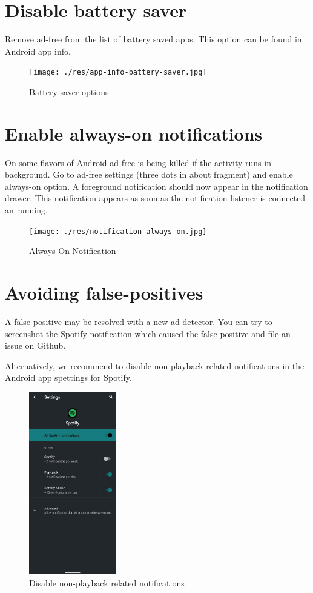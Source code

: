 \documentclass[11pt]{article}
\begin{document}
\section{Disable battery saver}
\label{sec:org518a8ee}
Remove ad-free from the list of battery saved apps. This option can be
found in Android app info.

\begin{figure}[htbp]
\centering
\texttt{[image: ./res/app-info-battery-saver.jpg]}
\caption{Battery saver options}
\end{figure}

\section{Enable always-on notifications}
\label{sec:org715fc82}
On some flavors of Android ad-free is being killed if the activity
runs in background. Go to ad-free settings (three dots in about
fragment) and enable always-on option. A foreground notification
should now appear in the notification drawer. This notification
appears as soon as the notification listener is connected an running.

\begin{figure}[htbp]
\centering
\texttt{[image: ./res/notification-always-on.jpg]}
\caption{Always On Notification}
\end{figure}

\section{Avoiding false-positives}
\label{sec:orgfb24560}
A false-positive may be resolved with a new ad-detector. You can try to
screenshot the Spotify notification which caused the false-positive and file an
issue on Github.

Alternatively, we recommend to disable non-playback related notifications in the Android app spettings for Spotify.

\begin{figure}[htbp]
\centering
\includegraphics[height=300px]{./res/spotify-notifications.jpg}
\caption{Disable non-playback related notifications}
\end{figure}
\end{document}

